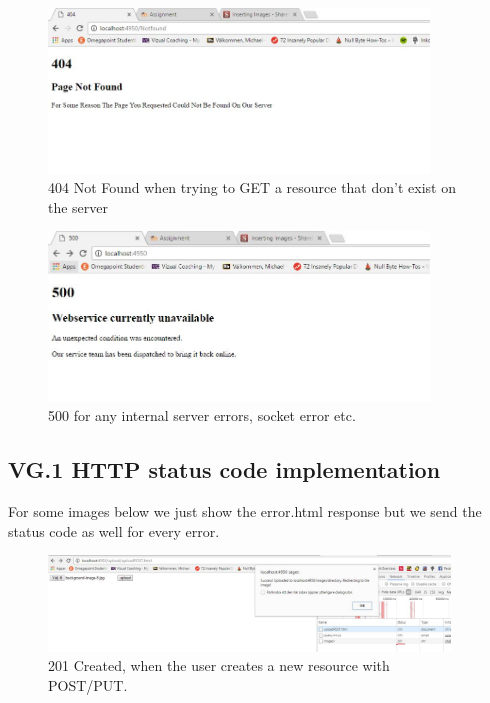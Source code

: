 \documentclass[a4paper,12pt]{article}
\numberwithin{figure}{section}
\begin{document}
\begin{figure}[h!]
	\centering
	\label{not found}
	\includegraphics[width=0.90\textwidth,keepaspectratio]{img/404.jpg} 
	\caption{404 Not Found when trying to GET a resource that don't exist on the server}
\end{figure}

\begin{figure}[h!]
	\centering
	\label{Server error}
	\includegraphics[width=0.90\textwidth,keepaspectratio]{img/500.jpg} 
	\caption{500 for any internal server errors, socket error etc.}
\end{figure}

\newpage
\subsection{VG.1 HTTP status code implementation}

For some images below we just show the error.html response but we send the status code as well for every error.

\begin{figure}[h!]
	\centering
	\label{201}
	\includegraphics[width=0.95\textwidth,keepaspectratio]{img/201.jpg} 
	\caption{201 Created, when the user creates a new resource with POST/PUT.}
\end{figure}
\end{document}
